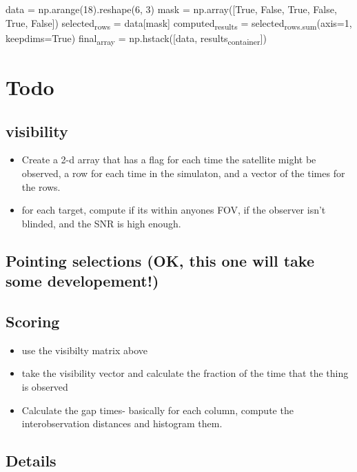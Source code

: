 \documentclass[11pt]{article}
\begin{document}
data = np.arange(18).reshape(6, 3)
mask = np.array([True, False, True, False, True, False])
selected\textsubscript{rows} = data[mask]
computed\textsubscript{results} = selected\textsubscript{rows.sum}(axis=1, keepdims=True)
final\textsubscript{array} = np.hstack([data, results\textsubscript{container}])

\section{Todo}
\label{sec:orge0fccca}

\subsection{visibility}
\label{sec:org0fb6ff7}
\begin{itemize}
\item Create a 2-d array that has a flag for each time the satellite
might be observed, a row for each time in the simulaton,
and a  vector of the times for the rows.
\item for each target, compute if its within anyones FOV, if the
observer isn't blinded, and the SNR is high enough.
\end{itemize}

\subsection{Pointing selections (OK, this one will take some developement!)}
\label{sec:orgf71ac6a}

\subsection{Scoring}
\label{sec:orgd329811}
\begin{itemize}
\item use the visibilty matrix above
\item take the visibility vector and calculate the fraction
of the time that the thing is observed
\item Calculate the gap times- basically for each column,
compute the interobservation distances and histogram
them.
\end{itemize}



\subsection{Details}
\label{sec:org42455de}
\end{document}
